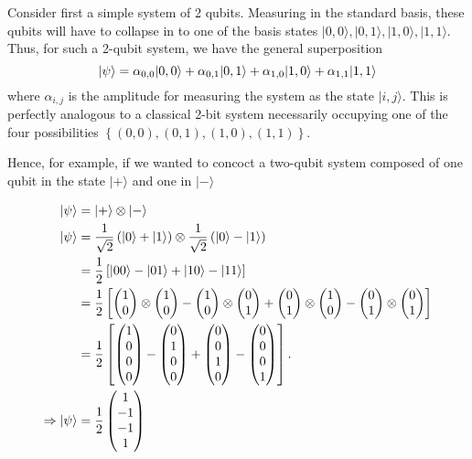 Consider first a simple system of 2 qubits. Measuring in the standard basis, these qubits will have to collapse in to one of the basis states $|0,0 \rangle, |0,1 \rangle, |1,0\rangle, |1,1\rangle $. Thus, for such a 2-qubit system, we have the general superposition
$$ \ket{\psi} = \alpha_{0,0} |0,0 \rangle + \alpha_{0,1}|0,1 \rangle + \alpha_{1,0} |1,0\rangle +\alpha_{1,1} |1,1\rangle $$ 
where $\alpha_{i,j}$ is the amplitude for measuring the system as the state $|i,j\rangle $. 
This is perfectly analogous to a classical 2-bit system necessarily occupying one of the four possibilities $\left\{ (0,0), (0,1), (1,0), (1,1) \right\}$.

Hence, for example, if we wanted to concoct a two-qubit system composed of one qubit in the state $|+\rangle$ and one in $|-\rangle$

\begin{equation}
    \begin{split}
    \ket{\psi} &= |+\rangle \otimes |-\rangle 
    \\ \ket{\psi} &=  \frac{1}{\sqrt{2}} \left( \ket{0} + \ket{1} \right) \otimes  \frac{1}{\sqrt{2}} \left( \ket{0} - \ket{1} \right)
    \\ &= \frac{1}{2} \left[ \ket{00} - \ket{01} + \ket{10} - \ket{11} \right] 
    \\ &= \frac{1}{2} \left[ \left(\begin{matrix}1\\0\end{matrix}\right) \otimes \left(\begin{matrix}1\\0\end{matrix}\right) - \left(\begin{matrix}1\\0\end{matrix}\right) \otimes \left(\begin{matrix}0\\1\end{matrix}\right) + \left(\begin{matrix}0\\1\end{matrix}\right) \otimes \left(\begin{matrix}1\\0\end{matrix}\right) - \left(\begin{matrix}0\\1\end{matrix}\right) \otimes \left(\begin{matrix}0\\1\end{matrix}\right) \right]
    \\ &= \frac{1}{2} \left[ \left(\begin{matrix}1\\0\\0\\0\end{matrix}\right) - \left(\begin{matrix}0\\1\\0\\0\end{matrix}\right) + \left(\begin{matrix}0\\0\\1\\0\end{matrix}\right) - \left(\begin{matrix}0\\0\\0\\1\end{matrix}\right) \right].
    \\ \Rightarrow \ket{\psi} &= \frac{1}{2} \left(\begin{matrix}1\\-1\\-1\\1\end{matrix}\right) 
    \end{split}
\end{equation}


